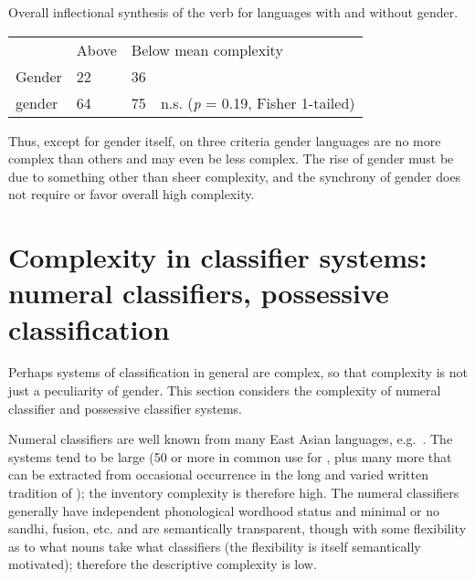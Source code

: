 \documentclass[output=collectionpaper]{langsci/langscibook}
\begin{document}
\ea
Overall inflectional synthesis of the verb for languages with and without gender.\\
\medskip
\begin{tabular}{p{2.7cm}p{1.3cm}p{1.3cm}l}
		 &	Above 	 &	\multicolumn{2}{l}{Below mean complexity} \\
	Gender	 &	22	 &	36 \\
	\ili{No} gender  &	64	 &	75	 &	n.s. (\textit{p} = 0.19, Fisher 1-tailed) \\
\end{tabular}
\z

Thus, except for gender itself, on three criteria gender languages are no more complex than others and may even be less complex. The rise of gender must be due to something other than sheer complexity, and the synchrony of gender does not require or favor overall high complexity.


\section{Complexity in classifier systems: numeral classifiers, possessive classification}
\label{sec:Nich:4}

Perhaps systems of classification in general are complex, so that complexity is not just a peculiarity of gender. This section considers the complexity of numeral classifier and possessive classifier systems.

	Numeral classifiers are well known from many East Asian languages, e.g.\ . The systems tend to be large (50 or more in common use for , plus many more that can be extracted from occasional occurrence in the long and varied written tradition of ); the inventory complexity is therefore high. The numeral classifiers generally have independent phonological wordhood status and minimal or no sandhi, fusion, etc. and are semantically transparent, though with some flexibility as to what nouns take what classifiers (the flexibility is itself semantically motivated); therefore the descriptive complexity is low.
\end{document}
